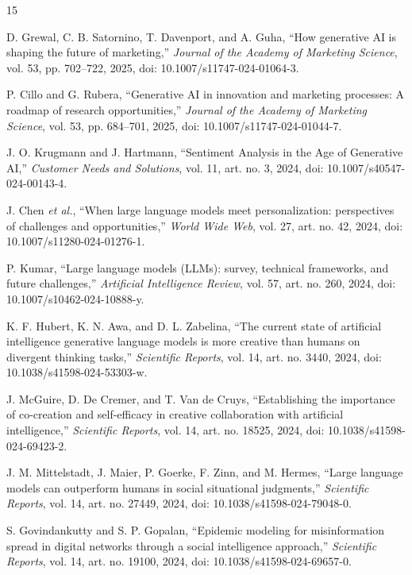 \documentclass[conference]{IEEEtran}
\begin{document}
\begin{thebibliography}{15}

D. Grewal, C. B. Satornino, T. Davenport, and A. Guha, ``How generative AI is shaping the future of marketing,'' \emph{Journal of the Academy of Marketing Science}, vol. 53, pp. 702--722, 2025, doi: 10.1007/s11747-024-01064-3.

P. Cillo and G. Rubera, ``Generative AI in innovation and marketing processes: A roadmap of research opportunities,'' \emph{Journal of the Academy of Marketing Science}, vol. 53, pp. 684--701, 2025, doi: 10.1007/s11747-024-01044-7.

J. O. Krugmann and J. Hartmann, ``Sentiment Analysis in the Age of Generative AI,'' \emph{Customer Needs and Solutions}, vol. 11, art. no. 3, 2024, doi: 10.1007/s40547-024-00143-4.

J. Chen \emph{et al.}, ``When large language models meet personalization: perspectives of challenges and opportunities,'' \emph{World Wide Web}, vol. 27, art. no. 42, 2024, doi: 10.1007/s11280-024-01276-1.

P. Kumar, ``Large language models (LLMs): survey, technical frameworks, and future challenges,'' \emph{Artificial Intelligence Review}, vol. 57, art. no. 260, 2024, doi: 10.1007/s10462-024-10888-y.

K. F. Hubert, K. N. Awa, and D. L. Zabelina, ``The current state of artificial intelligence generative language models is more creative than humans on divergent thinking tasks,'' \emph{Scientific Reports}, vol. 14, art. no. 3440, 2024, doi: 10.1038/s41598-024-53303-w.

J. McGuire, D. De Cremer, and T. Van de Cruys, ``Establishing the importance of co-creation and self-efficacy in creative collaboration with artificial intelligence,'' \emph{Scientific Reports}, vol. 14, art. no. 18525, 2024, doi: 10.1038/s41598-024-69423-2.

J. M. Mittelstadt, J. Maier, P. Goerke, F. Zinn, and M. Hermes, ``Large language models can outperform humans in social situational judgments,'' \emph{Scientific Reports}, vol. 14, art. no. 27449, 2024, doi: 10.1038/s41598-024-79048-0.

S. Govindankutty and S. P. Gopalan, ``Epidemic modeling for misinformation spread in digital networks through a social intelligence approach,'' \emph{Scientific Reports}, vol. 14, art. no. 19100, 2024, doi: 10.1038/s41598-024-69657-0.


\end{thebibliography}
\end{document}
